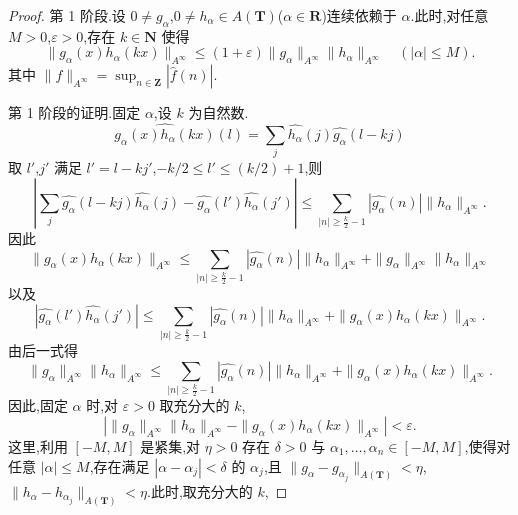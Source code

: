 \begin{proof}
第 1 阶段.设 $0 \neq g_{\alpha}$,$0 \neq h_{\alpha} \in A(\mathbf{T})$($\alpha \in \mathbf{R}$)连续依赖于 $\alpha$.此时,对任意 $M > 0$,$\varepsilon > 0$,存在 $k \in \mathbf{N}$ 使得
\begin{equation*}
\|g_{\alpha}(x)h_{\alpha}(kx)\|_{A^{\infty}} \leq (1 + \varepsilon)\|g_{\alpha}\|_{A^{\infty}}\|h_{\alpha}\|_{A^{\infty}} \quad (|\alpha| \leq M).
\end{equation*}
其中 $\|f\|_{A^{\infty}} = \sup_{n \in \mathbf{Z}}\left|\hat{f}(n)\right|$.

第 1 阶段的证明.固定 $\alpha$,设 $k$ 为自然数.
\begin{equation*}
\widehat{g_{\alpha}(x)h_{\alpha}(kx)}(l) = \sum_{j}\widehat{h_{\alpha}}(j)\widehat{g_{\alpha}}(l - kj)
\end{equation*}
取 $l'$,$j'$ 满足 $l' = l - kj'$,$-k/2 \leq l' \leq (k/2) + 1$,则
\begin{equation*}
\left|\sum_{j}\widehat{g_{\alpha}}(l - kj)\widehat{h_{\alpha}}(j) - \widehat{g_{\alpha}}(l')\widehat{h_{\alpha}}(j')\right| \leq \sum_{|n| \geq \frac{k}{2} - 1}\left|\widehat{g_{\alpha}}(n)\right|\|h_{\alpha}\|_{A^{\infty}}.
\end{equation*}
因此
\begin{equation*}
\|g_{\alpha}(x)h_{\alpha}(kx)\|_{A^{\infty}} \leq \sum_{|n| \geq \frac{k}{2} - 1}\left|\widehat{g_{\alpha}}(n)\right|\|h_{\alpha}\|_{A^{\infty}} + \|g_{\alpha}\|_{A^{\infty}}\|h_{\alpha}\|_{A^{\infty}}
\end{equation*}
以及
\begin{equation*}
\left|\widehat{g_{\alpha}}(l')\widehat{h_{\alpha}}(j')\right| \leq \sum_{|n| \geq \frac{k}{2} - 1}\left|\widehat{g_{\alpha}}(n)\right|\|h_{\alpha}\|_{A^{\infty}} + \|g_{\alpha}(x)h_{\alpha}(kx)\|_{A^{\infty}}.
\end{equation*}
由后一式得
\begin{equation*}
\|g_{\alpha}\|_{A^{\infty}}\|h_{\alpha}\|_{A^{\infty}} \leq \sum_{|n| \geq \frac{k}{2} - 1}\left|\widehat{g_{\alpha}}(n)\right|\|h_{\alpha}\|_{A^{\infty}} + \|g_{\alpha}(x)h_{\alpha}(kx)\|_{A^{\infty}}.
\end{equation*}
因此,固定 $\alpha$ 时,对 $\varepsilon > 0$ 取充分大的 $k$,
\begin{equation*}
\left|\|g_{\alpha}\|_{A^{\infty}}\|h_{\alpha}\|_{A^{\infty}} - \|g_{\alpha}(x)h_{\alpha}(kx)\|_{A^{\infty}}\right| < \varepsilon.
\end{equation*}
这里,利用 $[-M, M]$ 是紧集,对 $\eta > 0$ 存在 $\delta > 0$ 与 $\alpha_{1}, \ldots, \alpha_{n} \in [-M, M]$,使得对任意 $|\alpha| \leq M$,存在满足 $|\alpha - \alpha_{j}| < \delta$ 的 $\alpha_{j}$,且 $\|g_{\alpha} - g_{\alpha_{j}}\|_{A(\mathbf{T})} < \eta$,$\|h_{\alpha} - h_{\alpha_{j}}\|_{A(\mathbf{T})} < \eta$.此时,取充分大的 $k$,

\end{proof}
